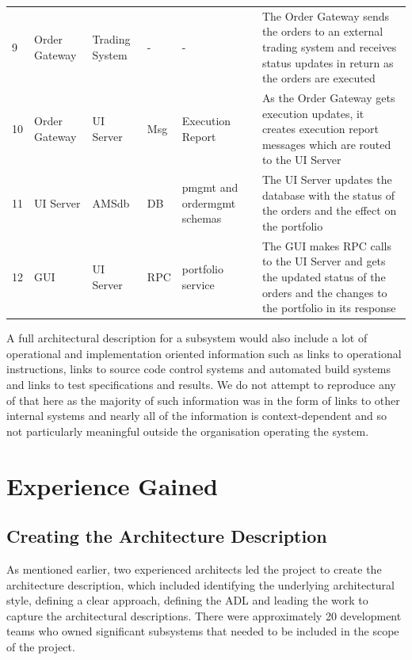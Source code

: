 \begin{table}
\begin{tabular}{| p{0.5cm} p{2cm} p{2cm} l p{2cm} p{4.9cm} |}
9 & Order Gateway & Trading System & - & - & The Order Gateway sends the orders to an external trading system and receives status updates in return as the orders are executed \\

10 & Order Gateway & UI Server & Msg & Execution Report & As the Order Gateway gets execution updates, it creates execution report messages which are routed to the UI Server \\

11 & UI Server & AMSdb & DB & pmgmt and ordermgmt schemas & The UI Server updates the database with the status of the orders and the effect on the portfolio \\

12 & GUI & UI Server & RPC & portfolio service & The GUI makes RPC calls to the UI Server and gets the updated status of the orders and the changes to the portfolio in its response \\
\hline
\end{tabular}
\end{table}

  A full architectural description for a subsystem would also include a lot of operational and implementation oriented information such as links to operational instructions, links to source code control systems and automated build systems and links to test specifications and results.  We do not attempt to reproduce any of that here as the majority of such information was in the form of links to other internal systems and nearly all of the information is context-dependent and so not particularly meaningful outside the organisation operating the system.

\section{Experience Gained}

\subsection{Creating the Architecture Description}

  As mentioned earlier, two experienced architects led the project to create the architecture description, which included identifying the underlying architectural style, defining a clear approach, defining the ADL and leading the work to capture the architectural descriptions.  There were approximately 20 development teams who owned significant subsystems that needed to be included in the scope of the project.

